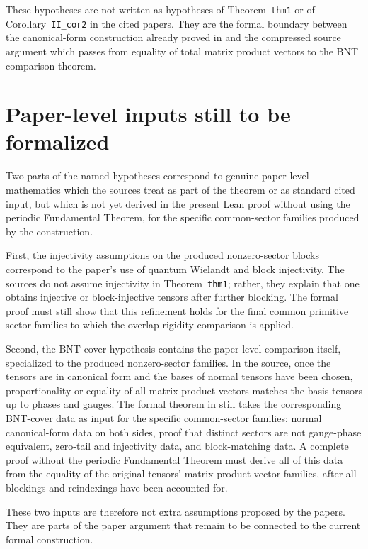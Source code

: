\documentclass{article}
\begin{document}
These hypotheses are not written as hypotheses of Theorem~\texttt{thm1} or of
Corollary~\texttt{II\_cor2} in the cited papers. They are the formal boundary
between the canonical-form construction already proved in \Lean{} and the
compressed source argument which passes from equality of total matrix product
vectors to the BNT comparison theorem.

\section{Paper-level inputs still to be formalized}

Two parts of the named hypotheses correspond to genuine paper-level mathematics
which the sources treat as part of the theorem or as standard cited input, but
which is not yet derived in the present Lean proof without using the periodic
Fundamental Theorem, for the specific common-sector families produced by the
construction.

First, the injectivity assumptions on the produced nonzero-sector blocks
correspond to the paper's use of quantum Wielandt and block injectivity. The
sources do not assume injectivity in Theorem~\texttt{thm1}; rather, they explain
that one obtains injective or block-injective tensors after further blocking.
The formal proof must still show that this refinement holds for the final
common primitive sector families to which the overlap-rigidity comparison is
applied.

Second, the BNT-cover hypothesis contains the paper-level comparison itself,
specialized to the produced nonzero-sector families. In the source, once the
tensors are in canonical form and the bases of normal tensors have been chosen,
proportionality or equality of all matrix product vectors matches the basis
tensors up to phases and gauges. The formal theorem in  still takes
the corresponding BNT-cover data as input for the specific common-sector
families: normal canonical-form data on both sides, proof that distinct sectors
are not gauge-phase equivalent, zero-tail and injectivity data, and
block-matching data. A complete proof without the periodic
Fundamental Theorem must derive all of this data from the equality of the
original tensors' matrix product vector families, after all blockings and
reindexings have been accounted for.

These two inputs are therefore not extra assumptions proposed by the papers. They
are parts of the paper argument that remain to be connected to the current
formal construction.
\end{document}
